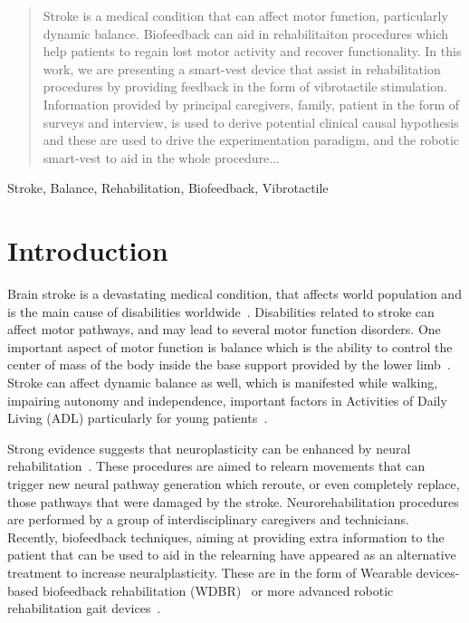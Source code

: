 \documentclass[conference]{IEEEtran}
\begin{document}
\maketitle

\begin{abstract}
Stroke is a medical condition that can affect motor function, particularly dynamic balance.  Biofeedback can aid in rehabilitaiton procedures which help patients to regain lost motor activity and recover functionality.  In this work, we are presenting a smart-vest device that assist in rehabilitation procedures by providing feedback in the form of vibrotactile stimulation. Information provided by principal caregivers, family, patient in the form of surveys and interview, is used to derive potential clinical causal hypothesis and these are used to drive the experimentation paradigm, and the robotic smart-vest to aid in the whole procedure...
\end{abstract}

\begin{IEEEkeywords}
Stroke, Balance, Rehabilitation, Biofeedback, Vibrotactile
\end{IEEEkeywords}

\section{Introduction}

Brain stroke is a devastating medical condition, that affects world population and is the main cause of disabilities worldwide~\cite{Caplan.etal2023}.  Disabilities related to stroke can affect motor pathways, and may lead to several motor function disorders.   One important aspect of motor function is balance which is the ability to control the center of mass of the body inside the base support provided by the lower limb~\cite{Bowman2021}.  Stroke can affect dynamic balance as well,  which is manifested while walking, impairing autonomy and independence, important factors in Activities of Daily Living (ADL) particularly for young patients~\cite{Afrasiabifar.etal2020,Donato.etal2016}.


Strong evidence suggests that neuroplasticity can be enhanced by neural rehabilitation~\cite{DeAngelis.etal2021,Albert.etal2012}.  These procedures are aimed to relearn movements that can trigger new neural pathway generation which reroute, or even completely replace, those pathways that were damaged by the stroke.  Neurorehabilitation procedures are performed by a group of interdisciplinary caregivers and technicians.  Recently, biofeedback techniques, aiming at providing extra information to the patient that can be used to aid in the relearning have appeared as an alternative treatment to increase neuralplasticity. These are in the form of Wearable devices-based biofeedback rehabilitation (WDBR)~\cite{Peake.etal2018} or more advanced robotic rehabilitation gait devices~\cite{Zhao.etal2022,Peshkin.etal2005,Tong.etal2006}.  
\end{document}
